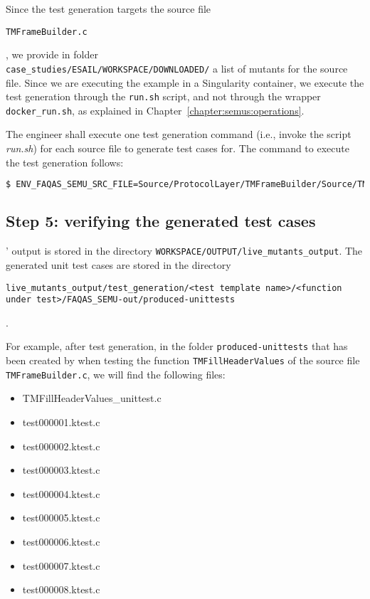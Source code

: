 Since the test generation targets the source file \begin{small}\texttt{TMFrameBuilder.c}\end{small}, we provide in folder\\
\texttt{case\_studies/ESAIL/WORKSPACE/DOWNLOADED/} a list of mutants for the source file.
Since we are executing the example in a Singularity container, we execute the test generation through the \texttt{run.sh} script, and not through the wrapper \texttt{docker\_run.sh}, as explained in Chapter~\ref{chapter:semus:operations}.

The engineer shall execute one test generation command (i.e., invoke the script \emph{run.sh}) for each source file to generate test cases for. The command to execute the test generation follows:

\begin{lstlisting}[language=bash]
 $ ENV_FAQAS_SEMU_SRC_FILE=Source/ProtocolLayer/TMFrameBuilder/Source/TMFrameBuilder.c ./run.sh mutation ../WORKSPACE/DOWNLOADED/live-Source.ProtocolLayer.TMFrameBuilder.Source.TMFrameBuilder  ../WORKSPACE/OUTPUT/live_mutants_output
\end{lstlisting}

\subsection{Step 5: verifying the generated test cases}

\SEMUS' output is stored in the directory \texttt{WORKSPACE/OUTPUT/live\_mutants\_output}. The generated unit test cases are stored in the directory \begin{small}\texttt{live\_mutants\_output/test\_generation/<test template name>/<function under test>/FAQAS\_SEMU-out/produced-unittests}\end{small}.

For example, after test generation, in the folder \texttt{produced-unittests} that has been created by \SEMUS when testing the function \texttt{TMFillHeaderValues}  of the source file \texttt{TMFrameBuilder.c}, we will find the following files:

\begin{itemize}
\item TMFillHeaderValues\_unittest.c
\item test000001.ktest.c
\item test000002.ktest.c
\item test000003.ktest.c
\item test000004.ktest.c
\item test000005.ktest.c
\item test000006.ktest.c
\item test000007.ktest.c
\item test000008.ktest.c
\end{itemize}

